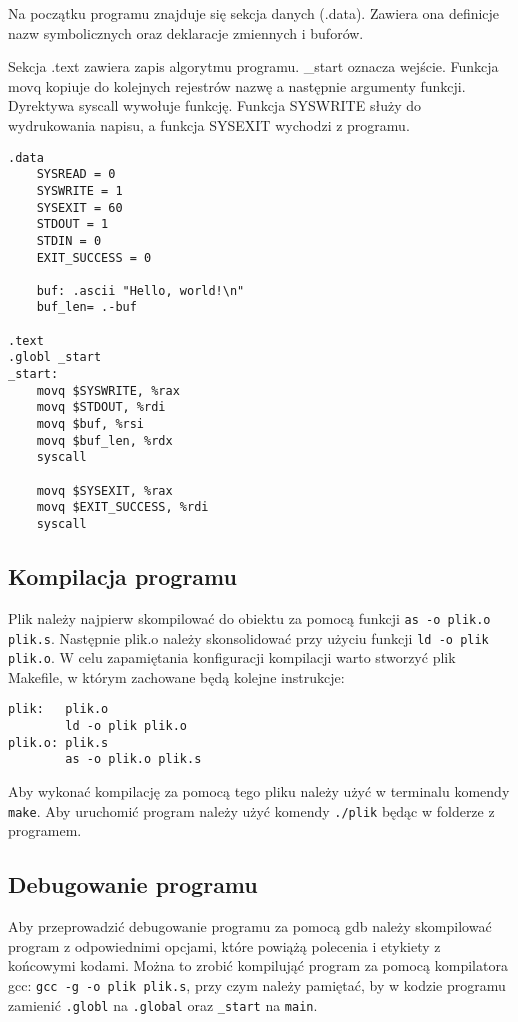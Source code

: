 \documentclass[polish, 11pt]{article}
\begin{document}
		\begin{minipage}{.5\textwidth}
		Na początku programu znajduje się sekcja danych (.data).
		Zawiera ona definicje nazw symbolicznych oraz deklaracje zmiennych i buforów.
		
		Sekcja .text zawiera zapis algorytmu programu. \_start oznacza wejście.
		Funkcja movq kopiuje do kolejnych rejestrów nazwę a następnie argumenty funkcji.
		Dyrektywa syscall wywołuje funkcję. Funkcja SYSWRITE służy do wydrukowania napisu,
		a funkcja SYSEXIT wychodzi z programu.
		\end{minipage}%
		\hspace{1cm}
		\begin{minipage}{.5\textwidth}
			\begin{lstlisting}
.data
	SYSREAD = 0
	SYSWRITE = 1
	SYSEXIT = 60
	STDOUT = 1
	STDIN = 0
	EXIT_SUCCESS = 0

	buf: .ascii "Hello, world!\n"
	buf_len= .-buf

.text
.globl _start
_start:
	movq $SYSWRITE, %rax
	movq $STDOUT, %rdi
	movq $buf, %rsi
	movq $buf_len, %rdx
	syscall
	
	movq $SYSEXIT, %rax
	movq $EXIT_SUCCESS, %rdi
	syscall
			\end{lstlisting}
		\end{minipage}
		
	\subsection{Kompilacja programu}
		Plik należy najpierw skompilować do obiektu za pomocą funkcji \texttt{as -o plik.o plik.s}.
		Następnie plik.o należy skonsolidować przy użyciu funkcji \texttt{ld -o plik plik.o}.
		W celu zapamiętania konfiguracji kompilacji warto stworzyć plik Makefile,
		w którym zachowane będą kolejne instrukcje:
		\begin{lstlisting}[tabsize=5]
plik:	plik.o
		ld -o plik plik.o
plik.o:	plik.s
		as -o plik.o plik.s
		\end{lstlisting}
		Aby wykonać kompilację za pomocą tego pliku należy użyć w terminalu komendy \texttt{make}.
		Aby uruchomić program należy użyć komendy \texttt{./plik} będąc w folderze z programem.
		
	\subsection{Debugowanie programu}
		Aby przeprowadzić debugowanie programu za pomocą gdb należy skompilować program z odpowiednimi opcjami,
		które powiążą polecenia i etykiety z końcowymi kodami.
		Można to zrobić kompilująć program za pomocą kompilatora gcc: \texttt{gcc -g -o plik plik.s},
		przy czym należy pamiętać, by w kodzie programu zamienić \texttt{.globl} na \texttt{.global}
		oraz \texttt{\_start} na \texttt{main}.
		
\end{document}

